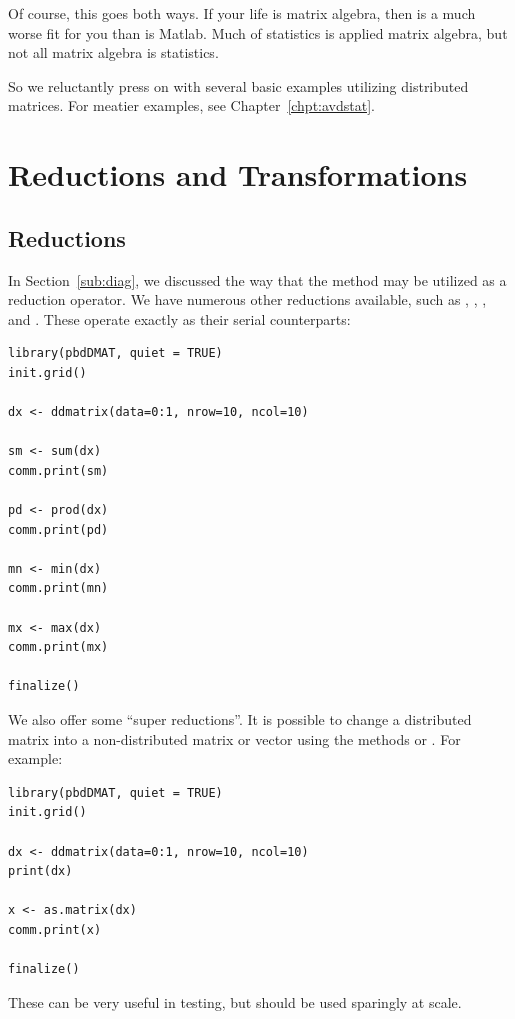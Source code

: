 Of course, this goes both ways.  If your life is matrix algebra, then  is a much worse fit for you than is Matlab.  Much of statistics is applied matrix algebra, but not all matrix algebra is statistics.

So we reluctantly press on with several basic examples utilizing distributed matrices.  For meatier examples, see Chapter~\ref{chpt:avdstat}.




\section{Reductions and Transformations}

\subsection{Reductions}

In Section~\ref{sub:diag}, we discussed the way that the  method may be utilized as a reduction operator.  We have numerous other reductions available, such as , , , and .  These operate exactly as their serial counterparts:
\begin{lstlisting}[language=rr,title=Reductions]
library(pbdDMAT, quiet = TRUE)
init.grid()

dx <- ddmatrix(data=0:1, nrow=10, ncol=10)

sm <- sum(dx)
comm.print(sm)

pd <- prod(dx)
comm.print(pd)

mn <- min(dx)
comm.print(mn)

mx <- max(dx)
comm.print(mx)

finalize()
\end{lstlisting}

We also offer some ``super reductions''.  It is possible to change a distributed matrix into a non-distributed matrix or vector using the methods  or .  For example:

\begin{lstlisting}[language=rr,title=Super Reductions]
library(pbdDMAT, quiet = TRUE)
init.grid()

dx <- ddmatrix(data=0:1, nrow=10, ncol=10)
print(dx)

x <- as.matrix(dx)
comm.print(x)

finalize()
\end{lstlisting}

These can be very useful in testing, but should be used sparingly at scale.




